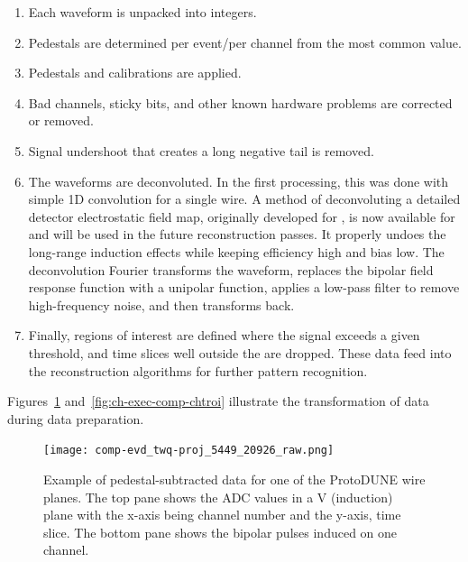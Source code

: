 \begin{enumerate}
\item Each waveform is unpacked into integers.
\item Pedestals are determined per event/per channel from the most common  value. 
\item Pedestals and calibrations are applied. %
\item Bad channels, sticky bits, and other known hardware problems are corrected or removed.
\item Signal undershoot that creates a long negative tail is removed. 
\item The waveforms  are deconvoluted.  In the first processing, this was done with simple 1D  convolution for a single wire.  A \twod  method of deconvoluting a detailed detector electrostatic field map, originally developed for \cite{Adams:2018dra}, is  now available for  and will be used in the future reconstruction passes.  It properly undoes the long-range induction effects while keeping efficiency high and bias low.  The deconvolution Fourier transforms the waveform, replaces the  bipolar field response function with a unipolar function, applies a low-pass filter to remove high-frequency noise, and then transforms back.





\item Finally, regions of interest are defined where the signal exceeds a given threshold, and time slices well outside the  are dropped. These data feed into the reconstruction algorithms for further pattern recognition. %
\end{enumerate}


Figures~\ref{fig:ch-exec-comp-chtraw} and~\ref{fig:ch-exec-comp-chtroi} illustrate the transformation of  data  during data preparation.

\begin{figure}[t]
\texttt{[image: comp-evd\_twq-proj\_5449\_20926\_raw.png]}
\caption{Example of pedestal-subtracted data for one of the ProtoDUNE  wire planes.  The top pane shows the ADC values in a V (induction) plane with the x-axis being channel number and the y-axis, time slice. The bottom pane shows the bipolar pulses induced on one channel. 
}
\label{fig:ch-exec-comp-chtraw}
\end{figure}

